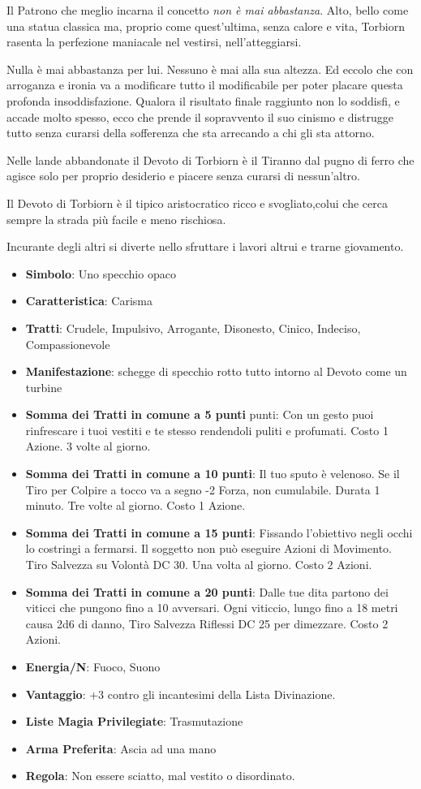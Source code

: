 \begin{multicols}{2}
Il Patrono che meglio incarna il concetto \emph{non è mai abbastanza}. Alto, bello come una statua classica ma, proprio come quest'ultima, senza calore e vita, Torbiorn rasenta la perfezione maniacale nel vestirsi, nell'atteggiarsi.

Nulla è mai abbastanza per lui. Nessuno è mai alla sua altezza. Ed eccolo che con arroganza e ironia va a modificare tutto il modificabile per poter placare questa profonda insoddisfazione. Qualora il risultato finale raggiunto non lo soddisfi, e accade molto spesso, ecco che prende il sopravvento il suo cinismo e distrugge tutto senza curarsi della sofferenza che sta arrecando a chi gli sta attorno.

Nelle lande abbandonate il Devoto di Torbiorn è il Tiranno dal pugno di ferro che agisce solo per proprio desiderio e piacere senza curarsi di nessun'altro.

Il Devoto di Torbiorn è il tipico aristocratico ricco e svogliato,colui che cerca sempre la strada più facile e meno rischiosa.

Incurante degli altri si diverte nello sfruttare i lavori altrui e trarne giovamento.

\begin{itemize}[leftmargin=*] \setlength{\itemsep}{0pt}
\item \textbf{Simbolo}: Uno specchio opaco
\item \textbf{Caratteristica}: Carisma
\item \textbf{Tratti}: Crudele, Impulsivo, Arrogante, Disonesto, Cinico, Indeciso, Compassionevole
\item \textbf{Manifestazione}: schegge di specchio rotto tutto intorno al Devoto come un turbine
\item \textbf{Somma dei Tratti in comune a 5 punti} punti: Con un gesto puoi rinfrescare i tuoi vestiti e te stesso rendendoli puliti e profumati. Costo 1 Azione. 3 volte al giorno.
\item \textbf{Somma dei Tratti in comune a 10 punti}: Il tuo sputo è velenoso. Se il Tiro per Colpire a tocco va a segno -2 Forza, non cumulabile. Durata 1 minuto. Tre volte al giorno. Costo 1 Azione.
\item \textbf{Somma dei Tratti in comune a 15 punti}: Fissando l'obiettivo negli occhi lo costringi a fermarsi. Il soggetto non può eseguire Azioni di Movimento. Tiro Salvezza su Volontà DC 30. Una volta al giorno. Costo 2 Azioni.
\item \textbf{Somma dei Tratti in comune a 20 punti}: Dalle tue dita partono dei viticci che pungono fino a 10 avversari. Ogni viticcio, lungo fino a 18 metri causa 2d6 di danno, Tiro Salvezza Riflessi DC 25 per dimezzare. Costo 2 Azioni.
\item \textbf{Energia/N}: Fuoco, Suono
\item \textbf{Vantaggio}: +3 contro gli incantesimi della Lista Divinazione.
\item \textbf{Liste Magia Privilegiate}: Trasmutazione
\item \textbf{Arma Preferita}: Ascia ad una mano
\item \textbf{Regola}: Non essere sciatto, mal vestito o disordinato.
\end{itemize}


\end{multicols}
